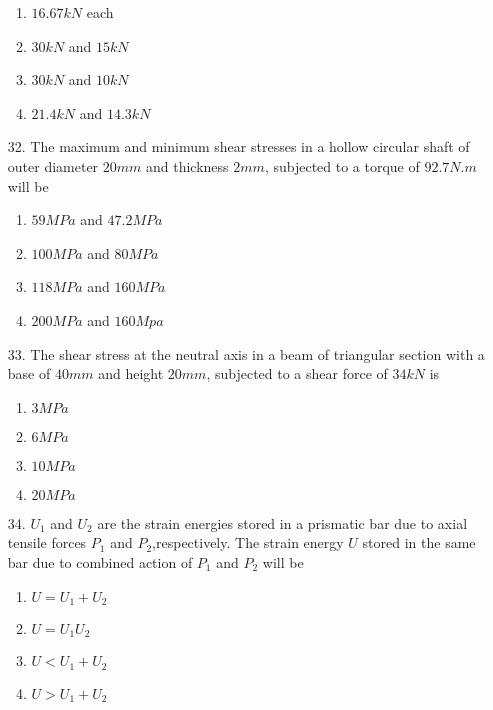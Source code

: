 \documentclass[journal,12pt,onecolumn]{IEEEtran}
\theoremstyle{remark}
\begin{document}
\begin{enumerate}
\begin{center}
\begin{tikzpicture}
	\end{tikzpicture} \end{center}
		\begin{enumerate}
                \item $16.67 kN$ each
                \item $30 kN$ and $15 kN$
                \item $30 kN$ and $10 kN$
                \item $21.4 kN$ and $14.3 kN$
        \end{enumerate}
\item[32.] The maximum and minimum shear stresses in a hollow circular shaft of outer diameter $20 mm$ and thickness $2 mm$, subjected to a torque of $92.7 N.m$ will be
	\begin{enumerate}
                \item $59 MPa$ and $47.2MPa$
                \item $100 MPa$ and $80 MPa$
                \item $118 MPa$ and $160 MPa$
                \item $200 MPa$ and $160 Mpa$
        \end{enumerate}
\item[33.] The shear stress at the neutral axis in a beam of triangular section with a base of $40 mm$ and height $20 mm$, subjected to a shear force of $34 kN$ is
	\begin{enumerate}
                \item $3 MPa$
                \item $6 MPa$
                \item $10 MPa$
                \item $20 MPa$
        \end{enumerate}
\item[34.] $U_1$ and $U_2$ are the strain energies stored in a prismatic bar due to axial tensile forces $P_1$ and $P_2$,respectively. The strain energy $U$ stored in the same bar due to combined action of $P_1$ and $P_2$ will be 
\begin{enumerate}
                \item $U=U_1+U_2$
                \item $U=U_1U_2$ 
                \item $U<U_1+U_2$ 
                \item $U>U_1+U_2$ 
        \end{enumerate}     

\end{enumerate}
\end{document}
